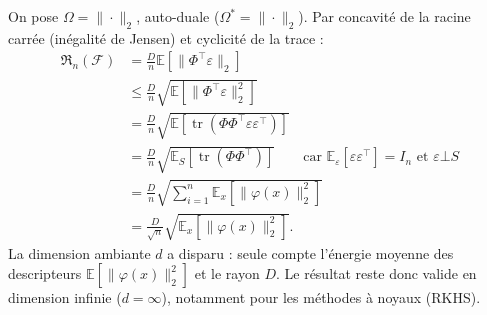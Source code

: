 \begin{proposition}
    On pose $\Omega = \|\cdot\|_2$, auto-duale ($\Omega^* = \|\cdot\|_2$). Par concavité de la racine carrée (inégalité de Jensen) et cyclicité de la trace :
    \begin{align*}
        \mathfrak{R}_n(\mathcal{F}) 
        &= \frac{D}{n} \mathbb{E} \left[ \|\Phi^\top \varepsilon\|_2 \right] \\
        &\leqslant \frac{D}{n} \sqrt{\mathbb{E} \left[ \|\Phi^\top \varepsilon\|_2^2 \right]} \\
        &= \frac{D}{n} \sqrt{\mathbb{E} \left[ \operatorname{tr}\left( \Phi \Phi^\top \varepsilon \varepsilon^\top \right) \right]} \\
        &= \frac{D}{n} \sqrt{\mathbb{E}_S \left[ \operatorname{tr}(\Phi \Phi^\top) \right]} \quad \quad \text{car } \mathbb{E}_\varepsilon[\varepsilon \varepsilon^\top] = I_n \text{ et } \varepsilon \bot S \\
        &= \frac{D}{n} \sqrt{\sum_{i=1}^n \mathbb{E}_x \left[ \|\varphi(x)\|_2^2 \right]} \\
        &= \frac{D}{\sqrt{n}} \sqrt{\mathbb{E}_x \left[ \|\varphi(x)\|_2^2 \right]}.
    \end{align*}
    La dimension ambiante $d$ a disparu : seule compte l'énergie moyenne des descripteurs $\mathbb{E}[\|\varphi(x)\|_2^2]$ et le rayon $D$. Le résultat reste donc valide en dimension infinie ($d = \infty$), notamment pour les méthodes à noyaux (RKHS).
\end{proposition}

